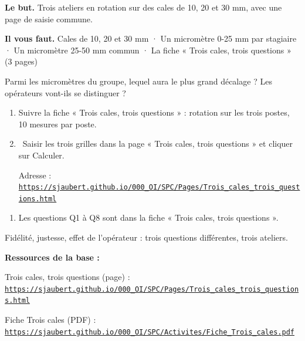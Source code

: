 \documentclass[10pt,a4paper]{article}
\begin{document}
\thispagestyle{fancy}
\begin{tcolorbox}[boite]\textbf{Le but.} Trois ateliers en rotation sur des cales de 10, 20 et 30 mm, avec une page de saisie commune.\par\textbf{Il vous faut.} Cales de 10, 20 et 30 mm · Un micromètre 0-25 mm par stagiaire · Un micromètre 25-50 mm commun · La fiche « Trois cales, trois questions » (3 pages)\end{tcolorbox}
\begin{tcolorbox}[pred]Parmi les micromètres du groupe, lequel aura le plus grand décalage ? Les opérateurs vont-ils se distinguer ?\reponse\end{tcolorbox}
\begin{enumerate}[label=\textcolor{cyan}{\textbf{\arabic*.}},leftmargin=15pt,itemsep=1.5pt]
\item Suivre la fiche « Trois cales, trois questions » : rotation sur les trois postes, 10 mesures par poste.
\item \tagW\ Saisir les trois grilles dans la page « Trois cales, trois questions » et cliquer sur Calculer.\par Adresse : \href{https://sjaubert.github.io/000_OI/SPC/Pages/Trois_cales_trois_questions.html}{\nolinkurl{https://sjaubert.github.io/000_OI/SPC/Pages/Trois_cales_trois_questions.html}}
\end{enumerate}
\begin{enumerate}[label=\textcolor{cyan}{\textbf{Q\arabic*.}},leftmargin=22pt]
\item Les questions Q1 à Q8 sont dans la fiche « Trois cales, trois questions ».\par\vspace{5pt}
\end{enumerate}
\begin{tcolorbox}[retenir]Fidélité, justesse, effet de l'opérateur : trois questions différentes, trois ateliers.\end{tcolorbox}
\vfill{\footnotesize\color{uimm}\textbf{Ressources de la base :}\par Trois cales, trois questions (page) : \href{https://sjaubert.github.io/000_OI/SPC/Pages/Trois_cales_trois_questions.html}{\nolinkurl{https://sjaubert.github.io/000_OI/SPC/Pages/Trois_cales_trois_questions.html}}\par Fiche Trois cales (PDF) : \href{https://sjaubert.github.io/000_OI/SPC/Activites/Fiche_Trois_cales.pdf}{\nolinkurl{https://sjaubert.github.io/000_OI/SPC/Activites/Fiche_Trois_cales.pdf}}}
\end{document}
